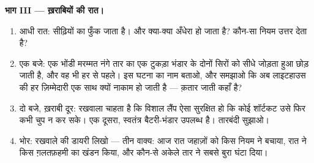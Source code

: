 \begin{problem}
\medskip\noindent\textbf{भाग III --- ख़राबियों की रात।}
\begin{enumerate}[resume]
  \item आधी रात: सीढ़ियों का  फुँक जाता है। और क्या-क्या अँधेरा
        हो जाता है? कौन-सा नियम उत्तर देता है?
  \item एक बजे: एक भोंडी मरम्मत नंगे तार का एक टुकड़ा भंडार के दोनों
        सिरों को सीधे जोड़ता हुआ छोड़ जाती है, और वह भी हर  से
        पहले। इस घटना का नाम बताओ, और समझाओ कि अब लाइटहाउस की हर
        ज़िम्मेदारी एक साथ क्यों नाकाम हो जाती है --- क़तार जाती
        कहाँ है?
  \item दो बजे, ख़राबी दूर: रखवाला चाहता है कि विशाल लैंप ऐसा सुरक्षित
        हो कि कोई शॉर्टकट उसे फिर कभी चुप न कर सके। एक दूसरा,
        स्वतंत्र बैटरी-भंडार उपलब्ध है। तारबंदी सुझाओ।
  \item भोर: रखवाले की डायरी लिखो --- तीन वाक्य: आज रात जहाज़ों को
        किस नियम ने बचाया, रात ने किस ग़लतफ़हमी का खंडन किया, और
        कौन-से अकेले तार ने सबसे बुरा घंटा दिया।
\end{enumerate}
\end{problem}
